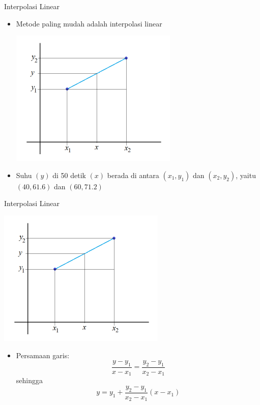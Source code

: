 \documentclass[pdflatex,compress,mathserif]{beamer}
\begin{document}
\begin{frame}{Interpolasi Linear}
	\begin{itemize}
		\item Metode paling mudah adalah interpolasi linear
		\begin{center}
			\includegraphics[width=0.5\linewidth]{img/img03}
		\end{center}
		\item Suhu $(y)$ di 50 detik $(x)$ berada di antara $(x_1, y_1)$ dan $(x_2, y_2)$, yaitu $(40, 61.6)$ dan $(60, 71.2)$
	\end{itemize}
\end{frame}

\begin{frame}{Interpolasi Linear}
	\begin{multicols}{2}
		\begin{center}
			\includegraphics[width=\linewidth]{img/img03}
		\end{center}
		\columnbreak
		\begin{itemize}
			\item Persamaan garis:
			$$ \frac{y - y_1}{x - x_1} = \frac{y_2 - y_1}{x_2 - x_1}$$
			sehingga
			$$ y = y_1 + \frac{y_2 - y_1}{x_2 - x_1} (x - x_1) $$
		\end{itemize}
	\end{multicols}
\end{frame}
\end{document}
